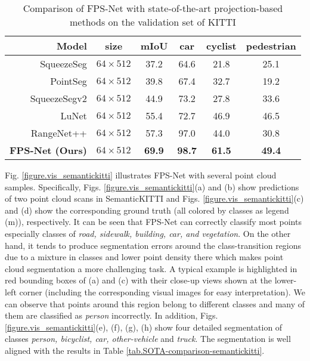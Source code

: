 \documentclass[preprint,review,3p]{elsarticle}
\begin{document}
\renewcommand\arraystretch{1.2}
\begin{table}[t]
  \caption{Comparison of FPS-Net with state-of-the-art projection-based methods on the validation set of KITTI}
  \centering
  \begin{tabular}{r|c|c|ccc}
    \hline
    Model & size & mIoU & car & cyclist & pedestrian \\
    \hline
    SqueezeSeg\cite{wu2018squeezeseg} & $64\times512$ & 37.2 & 64.6 & 21.8 & 25.1 \\
    PointSeg \cite{wang2018pointseg} & $64\times512$ & 39.8 & 67.4 & 32.7 & 19.2\\
    SqueezeSegv2\cite{wu2019squeezesegv2} & $64\times512$ & 44.9 & 73.2 & 27.8 & 33.6 \\
    LuNet\cite{biasutti2019lunet} & $64\times512$ & 55.4 & 72.7 & 46.9 & 46.5 \\
    RangeNet++\cite{milioto2019rangenet++} & $64\times512$ & 57.3 & 97.0 & 44.0 & 30.8 \\
    \hline
   \textbf{FPS-Net (Ours)} & $64\times512$ & \textbf{69.9} & \textbf{98.7} & \textbf{61.5} & \textbf{49.4} \\
    \hline
  \end{tabular}
  \label{tab.SOTA-comparison-kitti}
\end{table}



Fig. \ref{figure.vis_semantickitti} illustrates FPS-Net with several point cloud samples. Specifically, Figs. \ref{figure.vis_semantickitti}(a) and (b) show predictions of two point cloud scans in SemanticKITTI and Figs. \ref{figure.vis_semantickitti}(c) and (d) show the corresponding ground truth (all colored by classes as legend (m)), respectively. It can be seen that FPS-Net can correctly classify most points especially classes of \textit{road, sidewalk, building, car, and vegetation}. On the other hand, it tends to produce segmentation errors around the class-transition regions due to a mixture in classes and lower point density there which makes point cloud segmentation a more challenging task. A typical example is highlighted in red bounding boxes of (a) and (c) with their close-up views shown at the lower-left corner (including the corresponding visual images for easy interpretation). We can observe that points around this region belong to different classes and many of them are classified as \textit{person} incorrectly. In addition, Figs. \ref{figure.vis_semantickitti}(e), (f), (g), (h) show four detailed segmentation of classes \textit{person, bicyclist, car, other-vehicle} and \textit{truck}. The segmentation is well aligned with the results in Table \ref{tab.SOTA-comparison-semantickitti}.
\end{document}

